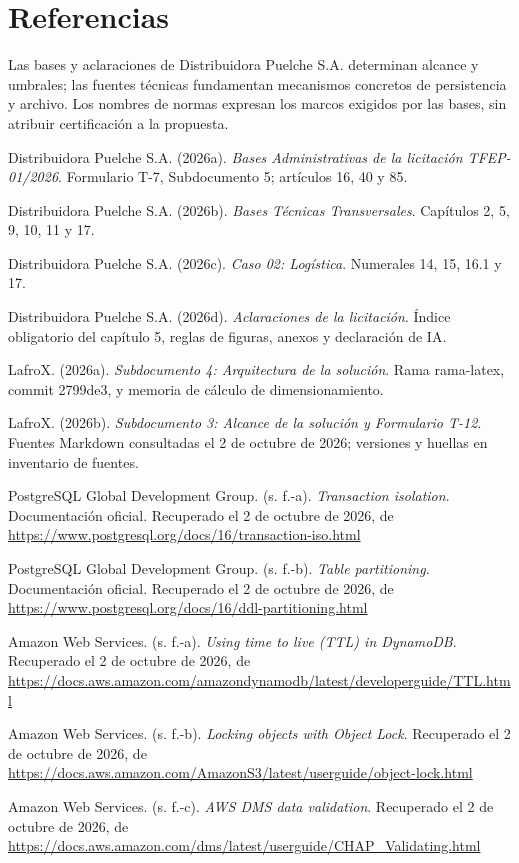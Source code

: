 \section*{Referencias}
Las bases y aclaraciones de Distribuidora Puelche S.A. determinan alcance y umbrales; las fuentes técnicas fundamentan mecanismos concretos de persistencia y archivo. Los nombres de normas expresan los marcos exigidos por las bases, sin atribuir certificación a la propuesta.

Distribuidora Puelche S.A. (2026a). \emph{Bases Administrativas de la licitación TFEP-01/2026}. Formulario T-7, Subdocumento 5; artículos 16, 40 y 85.

Distribuidora Puelche S.A. (2026b). \emph{Bases Técnicas Transversales}. Capítulos 2, 5, 9, 10, 11 y 17.

Distribuidora Puelche S.A. (2026c). \emph{Caso 02: Logística}. Numerales 14, 15, 16.1 y 17.

Distribuidora Puelche S.A. (2026d). \emph{Aclaraciones de la licitación}. Índice obligatorio del capítulo 5, reglas de figuras, anexos y declaración de IA.

LafroX. (2026a). \emph{Subdocumento 4: Arquitectura de la solución}. Rama rama-latex, commit 2799de3, y memoria de cálculo de dimensionamiento.

LafroX. (2026b). \emph{Subdocumento 3: Alcance de la solución y Formulario T-12}. Fuentes Markdown consultadas el 2 de octubre de 2026; versiones y huellas en inventario de fuentes.

PostgreSQL Global Development Group. (s. f.-a). \emph{Transaction isolation}. Documentación oficial. Recuperado el 2 de octubre de 2026, de \url{https://www.postgresql.org/docs/16/transaction-iso.html}

PostgreSQL Global Development Group. (s. f.-b). \emph{Table partitioning}. Documentación oficial. Recuperado el 2 de octubre de 2026, de \url{https://www.postgresql.org/docs/16/ddl-partitioning.html}

Amazon Web Services. (s. f.-a). \emph{Using time to live (TTL) in DynamoDB}. Recuperado el 2 de octubre de 2026, de \url{https://docs.aws.amazon.com/amazondynamodb/latest/developerguide/TTL.html}

Amazon Web Services. (s. f.-b). \emph{Locking objects with Object Lock}. Recuperado el 2 de octubre de 2026, de \url{https://docs.aws.amazon.com/AmazonS3/latest/userguide/object-lock.html}

Amazon Web Services. (s. f.-c). \emph{AWS DMS data validation}. Recuperado el 2 de octubre de 2026, de \url{https://docs.aws.amazon.com/dms/latest/userguide/CHAP_Validating.html}
